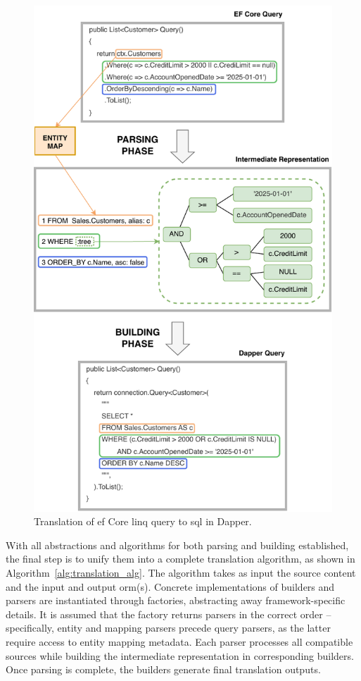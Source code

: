 \begin{figure}[!p]
  \centering
  \includegraphics[scale=1]{thesis/img/thesis/04_parsing_building_queries.drawio.pdf}
  \caption{Translation of \acrshort{ef} Core \acrshort{linq} query to \acrshort{sql} in Dapper.}
  \label{fig:translation_complete_query}
\end{figure}

With all abstractions and algorithms for both parsing and building established, the final step is to unify them into a complete translation algorithm, as shown in Algorithm~\ref{alg:translation_alg}. The algorithm takes as input the source content and the input and output \acrshort{orm}(s). Concrete implementations of builders and parsers are instantiated through factories, abstracting away framework-specific details. It is assumed that the factory returns parsers in the correct order -- specifically, entity and mapping parsers precede query parsers, as the latter require access to entity mapping metadata. Each parser processes all compatible sources while building the intermediate representation in corresponding builders. Once parsing is complete, the builders generate final translation outputs.

